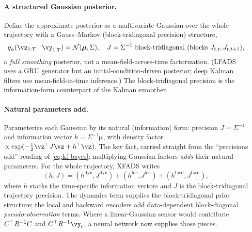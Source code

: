 \documentclass[11pt]{article}
\theoremstyle{plain}
\theoremstyle{definition}
\theoremstyle{remark}
\theoremstyle{definition}
\newcommand{\Normal}{\mathcal{N}}
\newcommand{\vmu}{\bm{\mu}}
\begin{document}
\paragraph{A structured Gaussian posterior.} Define the approximate posterior as a
multivariate Gaussian over the whole trajectory with a Gauss--Markov
(block-tridiagonal precision) structure,
\begin{equation}\label{eq:xf-post}
    q_{\phi}(\vz_{1:T}\mid\vy_{1:T}) = \Normal(\vmu, \Sigma), \quad
    J = \Sigma^{-1} \text{ block-tridiagonal (blocks } J_{t,t}, J_{t,t+1}\text{)} ,
\end{equation}
a \emph{full smoothing} posterior, not a mean-field-across-time factorization. (LFADS
\parencite{Pandarinath2018-lfads} uses a GRU generator but an
initial-condition-driven posterior; deep Kalman filters \parencite{Krishnan2017-dkf}
use mean-field-in-time inference.) The block-tridiagonal precision is the
information-form counterpart of the Kalman smoother.

\paragraph{Natural parameters add.} Parameterize each Gaussian by its natural
(information) form: precision $J = \Sigma^{-1}$ and information vector $h =
\Sigma^{-1}\vmu$, with density factor $\propto \exp(-\tfrac12\vz\trp J\vz +
h\trp\vz)$. The key fact, carried straight from the ``precisions add'' reading of
\eqref{eq:kf-bayes}: multiplying Gaussian factors \emph{adds} their natural
parameters. For the whole trajectory, XFADS writes
\begin{equation}\label{eq:xf-additive}
    (h, J) = (h^{\mathrm{dyn}}, J^{\mathrm{dyn}})
        + (h^{\mathrm{loc}}, J^{\mathrm{loc}})
        + (h^{\mathrm{bwd}}, J^{\mathrm{bwd}}) ,
\end{equation}
where $h$ stacks the time-specific information vectors and $J$ is the
block-tridiagonal trajectory precision. The dynamics term supplies the
block-tridiagonal prior structure; the local and backward encoders add
data-dependent block-diagonal \emph{pseudo-observation} terms. Where a
linear-Gaussian sensor would contribute $C{^\top} R^{-1} C$ and $C\trp R^{-1}\vy_t$, a
neural network now supplies those pieces.
\end{document}
